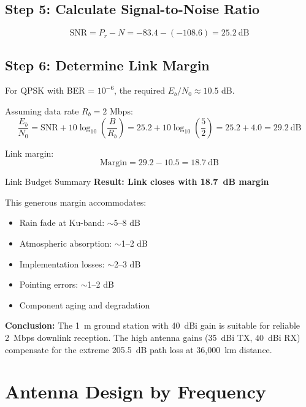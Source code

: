 \subsection*{Step 5: Calculate Signal-to-Noise Ratio}

\begin{equation}
\text{SNR} = P_r - N = -83.4 - (-108.6) = 25.2\ \text{dB}
\end{equation}

\subsection*{Step 6: Determine Link Margin}

For QPSK with BER = $10^{-6}$, the required $E_b/N_0 \approx 10.5$ dB.

Assuming data rate $R_b = 2$ Mbps:
\begin{equation}
\frac{E_b}{N_0} = \text{SNR} + 10\log_{10}\left(\frac{B}{R_b}\right) = 25.2 + 10\log_{10}\left(\frac{5}{2}\right) = 25.2 + 4.0 = 29.2\ \text{dB}
\end{equation}

Link margin:
\begin{equation}
\text{Margin} = 29.2 - 10.5 = 18.7\ \text{dB}
\end{equation}

\begin{calloutbox}[colback=black!8!white,colframe=black]{Link Budget Summary}
\textbf{Result: Link closes with 18.7~dB margin}

This generous margin accommodates:
\begin{itemize}
\item Rain fade at Ku-band: $\sim$5--8 dB
\item Atmospheric absorption: $\sim$1--2 dB
\item Implementation losses: $\sim$2--3 dB
\item Pointing errors: $\sim$1--2 dB
\item Component aging and degradation
\end{itemize}

\textbf{Conclusion:} The 1~m ground station with 40~dBi gain is suitable for reliable 2~Mbps downlink reception. The high antenna gains (35~dBi TX, 40~dBi RX) compensate for the extreme 205.5~dB path loss at 36,000~km distance.
\end{calloutbox}

\section{Antenna Design by Frequency}

